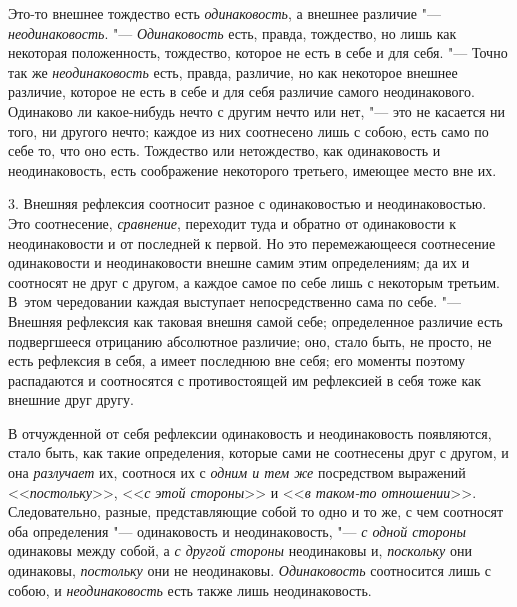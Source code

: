 Это-то внешнее тождество есть {\em одинаковость}, а
внешнее различие "--- {\em неодинаковость}. "---
{\em Одинаковость} есть, правда, тождество, но лишь как
некоторая положенность, тождество, которое не есть в себе и для себя. "---
Точно так же {\em неодинаковость} есть, правда,
различие, но как некоторое внешнее различие, которое не есть в себе и для
себя различие самого неодинакового. Одинаково ли какое-нибудь нечто с
другим нечто или нет, "--- это не касается ни того, ни другого нечто; каждое
из них соотнесено лишь с собою, есть само по себе то, что оно есть.
Тождество или нетождество, как одинаковость и неодинаковость, есть
соображение некоторого третьего, имеющее место вне их.

3. Внешняя рефлексия соотносит разное с одинаковостью и неодинаковостью. Это
соотнесение, {\em сравнение}, переходит туда и обратно
от одинаковости к неодинаковости и от последней к первой. Но это
перемежающееся соотнесение одинаковости и неодинаковости внешне самим этим
определениям; да их и соотносят не друг с другом, а каждое самое по себе
лишь с некоторым третьим. В~этом чередовании каждая выступает
непосредственно сама по себе. "--- Внешняя рефлексия как таковая внешня самой
себе; определенное различие есть подвергшееся отрицанию абсолютное
различие; оно, стало быть, не просто, не есть рефлексия в себя, а имеет
последнюю вне себя; его моменты поэтому распадаются и соотносятся с
противостоящей им рефлексией в себя тоже как внешние друг другу.

В отчужденной от себя рефлексии одинаковость и неодинаковость появляются,
стало быть, как такие определения, которые сами не соотнесены друг с
другом, и она {\em разлучает} их, соотнося их с
{\em одним и тем же} посредством выражений <<{\em постольку}>>, <<{\em с этой
стороны}>> и <<{\em в таком-то отношении}>>.
Следовательно, разные, представляющие собой то одно и то же, с чем
соотносят оба определения "--- одинаковость и неодинаковость, "---
{\em с одной стороны} одинаковы между собой, а
{\em с другой стороны} неодинаковы и,
{\em поскольку} они одинаковы, {\em постольку} они не неодинаковы.
{\em Одинаковость} соотносится лишь с собою, и
{\em неодинаковость} есть также лишь неодинаковость.

